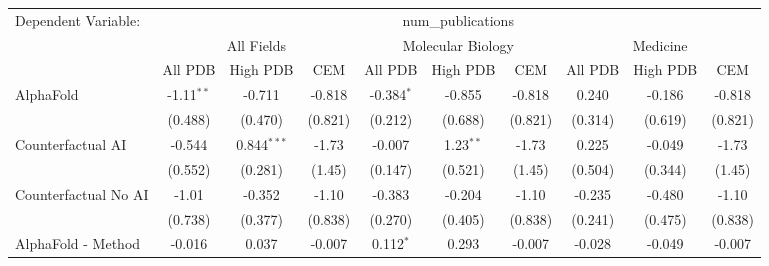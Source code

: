 \begingroup
\centering
\begin{tabular}{lccccccccc}
   \tabularnewline \midrule \midrule
   Dependent Variable: & \multicolumn{9}{c}{num\_publications}\\
 & \multicolumn{3}{c}{All Fields} & \multicolumn{3}{c}{Molecular Biology} & \multicolumn{3}{c}{Medicine} \\
\cmidrule(lr){2-7} \cmidrule(lr){5-10} \cmidrule(lr){8-7}
 & \multicolumn{1}{c}{All PDB} & \multicolumn{1}{c}{High PDB} & \multicolumn{1}{c}{CEM} & \multicolumn{1}{c}{All PDB} & \multicolumn{1}{c}{High PDB} & \multicolumn{1}{c}{CEM} & \multicolumn{1}{c}{All PDB} & \multicolumn{1}{c}{High PDB} & \multicolumn{1}{c}{CEM} \\
\cmidrule(lr){2-3} \cmidrule(lr){3-4} \cmidrule(lr){4-5} \cmidrule(lr){5-6} \cmidrule(lr){6-7} \cmidrule(lr){7-8} \cmidrule(lr){8-9} \cmidrule(lr){9-10} \cmidrule(lr){10-3}
   AlphaFold                                                   & -1.11$^{**}$   & -0.711          & -0.818         & -0.384$^{*}$  & -0.855        & -0.818         & 0.240         & -0.186          & -0.818\\   
                                                               & (0.488)        & (0.470)         & (0.821)        & (0.212)       & (0.688)       & (0.821)        & (0.314)       & (0.619)         & (0.821)\\   
   Counterfactual AI                                           & -0.544         & 0.844$^{***}$   & -1.73          & -0.007        & 1.23$^{**}$   & -1.73          & 0.225         & -0.049          & -1.73\\   
                                                               & (0.552)        & (0.281)         & (1.45)         & (0.147)       & (0.521)       & (1.45)         & (0.504)       & (0.344)         & (1.45)\\   
   Counterfactual No AI                                        & -1.01          & -0.352          & -1.10          & -0.383        & -0.204        & -1.10          & -0.235        & -0.480          & -1.10\\   
                                                               & (0.738)        & (0.377)         & (0.838)        & (0.270)       & (0.405)       & (0.838)        & (0.241)       & (0.475)         & (0.838)\\   
   AlphaFold - Method                                          & -0.016         & 0.037           & -0.007         & 0.112$^{*}$   & 0.293         & -0.007         & -0.028        & -0.049          & -0.007\\   

\end{tabular}
